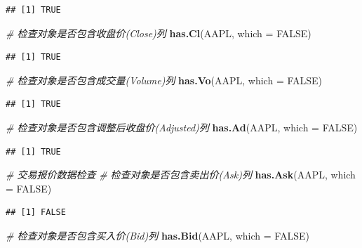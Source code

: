 \documentclass[]{ctexbook}
\newenvironment{Shaded}{\begin{snugshade}}{\end{snugshade}}
\newcommand{\AttributeTok}[1]{\textcolor[rgb]{0.13,0.29,0.53}{#1}}
\newcommand{\CommentTok}[1]{\textcolor[rgb]{0.56,0.35,0.01}{\textit{#1}}}
\newcommand{\ConstantTok}[1]{\textcolor[rgb]{0.56,0.35,0.01}{#1}}
\newcommand{\FunctionTok}[1]{\textcolor[rgb]{0.13,0.29,0.53}{\textbf{#1}}}
\newcommand{\NormalTok}[1]{#1}
\begin{document}
\begin{verbatim}
## [1] TRUE
\end{verbatim}

\begin{Shaded}
\begin{Highlighting}[]
\CommentTok{\# 检查对象是否包含收盘价(Close)列}
\FunctionTok{has.Cl}\NormalTok{(AAPL, }\AttributeTok{which =} \ConstantTok{FALSE}\NormalTok{)}
\end{Highlighting}
\end{Shaded}

\begin{verbatim}
## [1] TRUE
\end{verbatim}

\begin{Shaded}
\begin{Highlighting}[]
\CommentTok{\# 检查对象是否包含成交量(Volume)列}
\FunctionTok{has.Vo}\NormalTok{(AAPL, }\AttributeTok{which =} \ConstantTok{FALSE}\NormalTok{)}
\end{Highlighting}
\end{Shaded}

\begin{verbatim}
## [1] TRUE
\end{verbatim}

\begin{Shaded}
\begin{Highlighting}[]
\CommentTok{\# 检查对象是否包含调整后收盘价(Adjusted)列}
\FunctionTok{has.Ad}\NormalTok{(AAPL, }\AttributeTok{which =} \ConstantTok{FALSE}\NormalTok{)}
\end{Highlighting}
\end{Shaded}

\begin{verbatim}
## [1] TRUE
\end{verbatim}

\begin{Shaded}
\begin{Highlighting}[]
\CommentTok{\# 交易报价数据检查}
\CommentTok{\# 检查对象是否包含卖出价(Ask)列}
\FunctionTok{has.Ask}\NormalTok{(AAPL, }\AttributeTok{which =} \ConstantTok{FALSE}\NormalTok{)}
\end{Highlighting}
\end{Shaded}

\begin{verbatim}
## [1] FALSE
\end{verbatim}

\begin{Shaded}
\begin{Highlighting}[]
\CommentTok{\# 检查对象是否包含买入价(Bid)列}
\FunctionTok{has.Bid}\NormalTok{(AAPL, }\AttributeTok{which =} \ConstantTok{FALSE}\NormalTok{)}
\end{Highlighting}
\end{Shaded}
\end{document}
